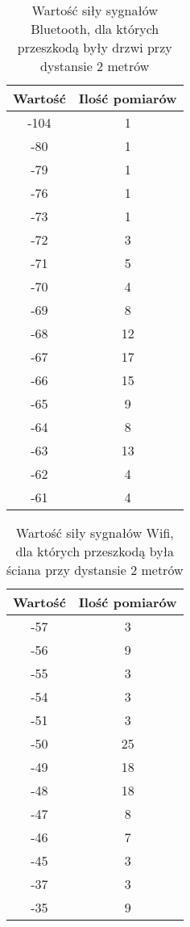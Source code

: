 \documentclass{article}
\begin{document}
\begin{table}[H]
	\caption {Wartość siły sygnałów Bluetooth, dla których przeszkodą były drzwi przy dystansie 2 metrów}
\begin{center}
		\begin{tabular}{|c|c|}
			\hline
			Wartość & Ilość pomiarów \\ 
			\hline
			-104 & 1\\
			\hline
			-80 & 1\\
			\hline
			-79 & 1\\
			\hline
			-76 & 1\\
			\hline
			-73 & 1\\
			\hline
			-72 & 3\\
			\hline
			-71 & 5\\
			\hline
			-70 & 4\\
			\hline
			-69 & 8\\
			\hline
			-68 & 12\\
			\hline
			-67 & 17\\
			\hline
			-66 & 15\\
			\hline
			-65 & 9\\
			\hline
			-64 & 8\\
			\hline
			-63 & 13\\
			\hline
			-62 & 4\\
			\hline
			-61 & 4\\
			\hline
		\end{tabular}
\end{center}
\end{table}
\begin{table}[H]
	\caption {Wartość siły sygnałów Wifi, dla których przeszkodą była ściana przy dystansie 2 metrów}
\begin{center}
		\begin{tabular}{|c|c|}
			\hline
			Wartość & Ilość pomiarów \\ 
			\hline
			-57 & 3\\
			\hline
			-56 & 9\\
			\hline
			-55 & 3\\
			\hline
			-54 & 3\\
			\hline
			-51 & 3\\
			\hline
			-50 & 25\\
			\hline
			-49 & 18\\
			\hline
			-48 & 18\\
			\hline
			-47 & 8\\
			\hline
			-46 & 7\\
			\hline
			-45 & 3\\
			\hline
			-37 & 3\\
			\hline
			-35 & 9\\
			\hline
		\end{tabular}
\end{center}
\end{table}
\end{document}
